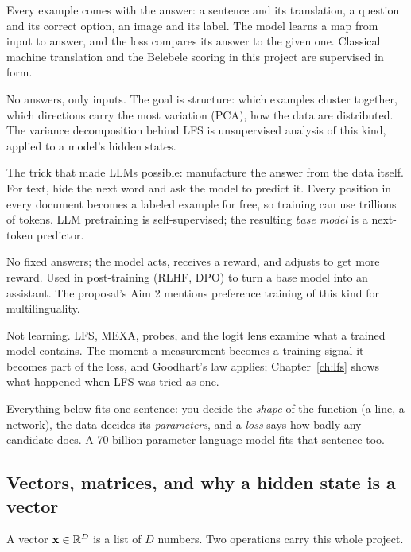 \begin{description}[leftmargin=3.2cm, style=nextline, itemsep=3pt]
\item[Supervised learning] Every example comes with the answer: a sentence
and its translation, a question and its correct option, an image and its
label. The model learns a map from input to answer, and the loss compares its
answer to the given one. Classical machine translation and the Belebele
scoring in this project are supervised in form.
\item[Unsupervised learning] No answers, only inputs. The goal is structure:
which examples cluster together, which directions carry the most variation
(PCA), how the data are distributed. The variance decomposition behind LFS
is unsupervised analysis of this kind, applied to a model's hidden states.
\item[Self-supervised learning] The trick that made LLMs possible: manufacture
the answer from the data itself. For text, hide the next word and ask the
model to predict it. Every position in every document becomes a labeled
example for free, so training can use trillions of tokens. LLM pretraining
is self-supervised; the resulting \emph{base model} is a next-token
predictor.
\item[Reinforcement learning] No fixed answers; the model acts, receives a
reward, and adjusts to get more reward. Used in post-training (RLHF, DPO)
to turn a base model into an assistant. The proposal's Aim 2 mentions
preference training of this kind for multilinguality.
\item[Measurement] Not learning. LFS, MEXA, probes, and the logit lens
examine what a trained model contains. The moment a measurement becomes a
training signal it becomes part of the loss, and Goodhart's law applies;
Chapter~\ref{ch:lfs} shows what happened when LFS was tried as one.
\end{description}

Everything below fits one sentence: you decide the \emph{shape} of the
function (a line, a network), the data decides its \emph{parameters}, and a
\emph{loss} says how badly any candidate does. A 70-billion-parameter
language model fits that sentence too.

\subsection{Vectors, matrices, and why a hidden state is a vector}

A vector $\mathbf{x} \in \mathbb{R}^D$ is a list of $D$ numbers. Two operations carry
this whole project.

